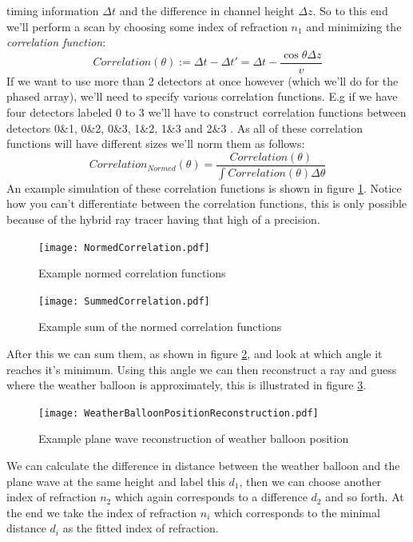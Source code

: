timing information $\Delta t$ and the difference in channel height $\Delta z$.
So to this end we'll perform a scan by choosing some index of refraction $n_1$ and
minimizing the \textit{correlation function}:
\begin{equation}
	Correlation(\theta) := \Delta t - \Delta t' = \Delta t
	- \frac{\cos\theta \Delta z}{v}
  \label{eqn:PlaneWave}
\end{equation}
If we want to use more than 2 detectors at once however (which we'll do for the phased array), 
we'll need to specify various correlation functions.  E.g
if we have four detectors labeled 0 to 3 we'll have to construct correlation
functions between detectors 0\&1, 0\&2, 0\&3, 1\&2, 1\&3 and 2\&3 .  As all of
these correlation functions will have different sizes we'll norm them as
follows:
\begin{equation}
	Correlation_{Normed}(\theta) =
	\frac{Correlation(\theta)}{\int Correlation(\theta)\Delta
	\theta}
\end{equation}
An example simulation of these correlation functions is shown in figure \ref{fig:NormedCorrelation}. 
Notice how you can't differentiate between the correlation functions, this is only possible
because of the hybrid ray tracer having that high of a precision.
\begin{figure}
	\centering
	\texttt{[image: NormedCorrelation.pdf]}
	\caption{Example normed correlation functions}
	\label{fig:NormedCorrelation}
\end{figure}
\begin{figure}
	\centering
	\texttt{[image: SummedCorrelation.pdf]}
	\caption{Example sum of the normed correlation functions}
	\label{fig:SummedCorrelation}
\end{figure}
After this we can sum them, as shown in figure \ref{fig:SummedCorrelation}, and look
at which angle it reaches it's minimum. Using this angle we can then reconstruct a ray and guess 
where the weather balloon is approximately, this is illustrated in figure 
\ref{fig:WeatherBalloonPositionReconstruction}. 
\begin{figure}
	\centering
	\texttt{[image: WeatherBalloonPositionReconstruction.pdf]}
	\caption{Example plane wave reconstruction of weather balloon position}
	\label{fig:WeatherBalloonPositionReconstruction}
\end{figure}
We can calculate the difference in distance between the weather balloon and the plane wave at the same height
and label this $d_1$, then we can choose another index of refraction $n_2$ which again corresponds to a difference
$d_2$ and so forth. At the end we take the index of refraction $n_i$ which corresponds to the minimal distance $d_i$
as the fitted index of refraction.

